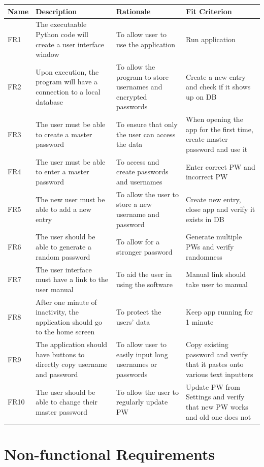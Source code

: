 \documentclass[12pt, titlepage]{article}
\begin{document}
\begin{center}
\begin{tabular}{ | p{1cm} | p{4cm} | p{4cm} | p{4cm} | }
	\hline
	Name & Description & Rationale & Fit Criterion\\
	\hline
	FR1 & The executaable Python code will create a user interface window & To allow user to use the application & Run application \\
	\hline
	FR2 & Upon execution, the program will have a connection to a local database & To allow the program to store usernames and encrypted passwords & Create a new entry and check if it shows up on DB \\
	\hline
	FR3 & The user must be able to create a master password & To ensure that only the user can access the data & When opening the app for the first time, create master password and use it \\
	\hline
	FR4 & The user must be able to enter a master password & To access and create passwords and usernames & Enter correct PW and incorrect PW \\
	\hline
	FR5 & The new user must be able to add a new entry & To allow the user to store a new username and password & Create new entry, close app and verify it exists in DB \\
	\hline
	FR6 & The user should be able to generate a random password & To allow for a stronger password & Generate multiple PWs and verify randomness \\
	\hline
	FR7 & The user interface must have a link to the user manual & To aid the user in using the software & Manual link should take user to manual \\
	\hline
	FR8 & After one minute of inactivity, the application should go to the home screen & To protect the users’ data & Keep app running for 1 minute \\
	\hline
	FR9 & The application should have buttons to directly copy username and password & To allow user to easily input long usernames or passwords & Copy existing password and verify that it pastes onto various text inputters \\
	\hline
	FR10 & The user should be able to change their master password & To allow the user to regularly update PW & Update PW from Settings and verify that new PW works and old one does not \\
\hline
\end{tabular}
\end{center}

\section{Non-functional Requirements}
\end{document}
